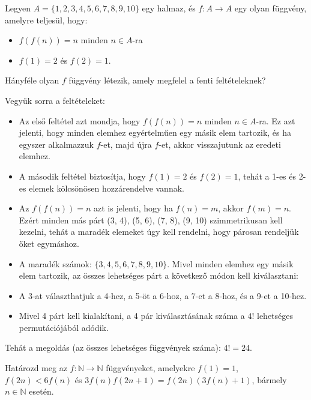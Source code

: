 \begin{extraproblem}
	Legyen $A=\{1,2,3,4,5,6,7,8,9,10\}$ egy halmaz, és $f:A\to A$ egy
	olyan függvény, amelyre teljesül, hogy:
	\begin{itemize}
		\item $f(f(n))=n$ minden $n\in A$-ra 
		\item $f(1)=2$ és $f(2)=1$. 
	\end{itemize}
	Hányféle olyan $f$ függvény létezik, amely megfelel a fenti feltételeknek? 
\end{extraproblem}
\begin{solution}
	Vegyük sorra a feltételeket:
	\begin{itemize}
		\item Az első feltétel azt mondja, hogy $f(f(n))=n$ minden $n\in A$-ra.
		Ez azt jelenti, hogy minden elemhez egyértelműen egy másik elem tartozik,
		és ha egyszer alkalmazzuk $f$-et, majd újra $f$-et, akkor visszajutunk
		az eredeti elemhez. 
		\item A második feltétel biztosítja, hogy $f(1)=2$ és $f(2)=1$, tehát
		a 1-es és 2-es elemek kölcsönösen hozzárendelve vannak. 
		\item Az $f(f(n))=n$ azt is jelenti, hogy ha $f(n)=m$, akkor $f(m)=n$.
		Ezért minden más párt (3, 4), (5, 6), (7, 8), (9, 10) szimmetrikusan
		kell kezelni, tehát a maradék elemeket úgy kell rendelni, hogy párosan
		rendeljük őket egymáshoz. 
		\item A maradék számok: $\{3,4,5,6,7,8,9,10\}$. Mivel minden elemhez egy
		másik elem tartozik, az összes lehetséges párt a következő módon kell
		kiválasztani: 
		\item A 3-at választhatjuk a 4-hez, a 5-öt a 6-hoz, a 7-et a 8-hoz, és a
		9-et a 10-hez. 
		\item Mivel 4 párt kell kialakítani, a 4 pár kiválasztásának száma a $4!$
		lehetséges permutációjából adódik. 
	\end{itemize}
	Tehát a megoldás (az összes lehetséges függvények száma): $4!=24$.
\end{solution}
\begin{extraproblem}
	Határozd meg az $f:\mathbb{N}\rightarrow\mathbb{N}$ függvényeket,
	amelyekre $f(1)=1$, $f(2n)<6f(n)$ és $3f(n)f(2n+1)=f(2n)(3f(n)+1)$,
	bármely $n\in\mathbb{N}$ esetén. 
\end{extraproblem}
